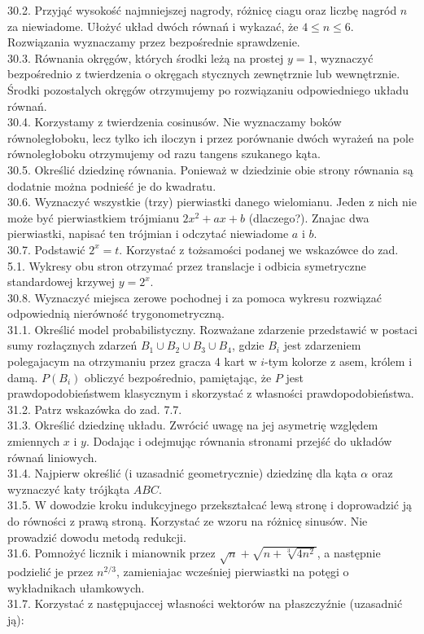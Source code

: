 \documentclass[10pt]{article}
\begin{document}
30.2. Przyjąć wysokość najmniejszej nagrody, różnicę ciagu oraz liczbę nagród $n$ za niewiadome. Ułożyć układ dwóch równań i wykazać, że $4 \leq n \leq 6$. Rozwiązania wyznaczamy przez bezpośrednie sprawdzenie.\\
30.3. Równania okręgów, których środki leżą na prostej $y=1$, wyznaczyć bezpośrednio z twierdzenia o okręgach stycznych zewnętrznie lub wewnętrznie. Środki pozostalych okręgów otrzymujemy po rozwiązaniu odpowiedniego układu równań.\\
30.4. Korzystamy z twierdzenia cosinusów. Nie wyznaczamy boków równoległoboku, lecz tylko ich iloczyn i przez porównanie dwóch wyrażeń na pole równoległoboku otrzymujemy od razu tangens szukanego kąta.\\
30.5. Określić dziedzinę równania. Ponieważ w dziedzinie obie strony równania są dodatnie można podnieść je do kwadratu.\\
30.6. Wyznaczyć wszystkie (trzy) pierwiastki danego wielomianu. Jeden z nich nie może być pierwiastkiem trójmianu $2 x^{2}+a x+b$ (dlaczego?). Znajac dwa pierwiastki, napisać ten trójmian i odczytać niewiadome $a$ i $b$.\\
30.7. Podstawić $2^{x}=t$. Korzystać z tożsamości podanej we wskazówce do zad. 5.1. Wykresy obu stron otrzymać przez translacje i odbicia symetryczne standardowej krzywej $y=2^{x}$.\\
30.8. Wyznaczyć miejsca zerowe pochodnej i za pomoca wykresu rozwiązać odpowiednią nierówność trygonometryczną.\\
31.1. Określić model probabilistyczny. Rozważane zdarzenie przedstawić w postaci sumy rozłaçznych zdarzeń $B_{1} \cup B_{2} \cup B_{3} \cup B_{4}$, gdzie $B_{i}$ jest zdarzeniem polegajacym na otrzymaniu przez gracza 4 kart w $i$-tym kolorze z asem, królem i damą. $P\left(B_{i}\right)$ obliczyć bezpośrednio, pamiętając, że $P$ jest prawdopodobieństwem klasycznym i skorzystać z własności prawdopodobieństwa.\\
31.2. Patrz wskazówka do zad. 7.7.\\
31.3. Określić dziedzinę układu. Zwrócić uwagę na jej asymetrię względem zmiennych $x$ i $y$. Dodając i odejmując równania stronami przejść do układów równań liniowych.\\
31.4. Najpierw określić (i uzasadnić geometrycznie) dziedzinę dla kąta $\alpha$ oraz wyznaczyć katy trójkąta $A B C$.\\
31.5. W dowodzie kroku indukcyjnego przekształcać lewą stronę i doprowadzić ją do równości z prawą stroną. Korzystać ze wzoru na różnicę sinusów. Nie prowadzić dowodu metodą redukcji.\\
31.6. Pomnożyć licznik i mianownik przez $\sqrt{n}+\sqrt{n+\sqrt[3]{4 n^{2}}}$, a następnie podzielić je przez $n^{2 / 3}$, zamieniajac wcześniej pierwiastki na potęgi o wykładnikach ułamkowych.\\
31.7. Korzystać z następujaccej własności wektorów na płaszczyźnie (uzasadnić ją):
\end{document}
